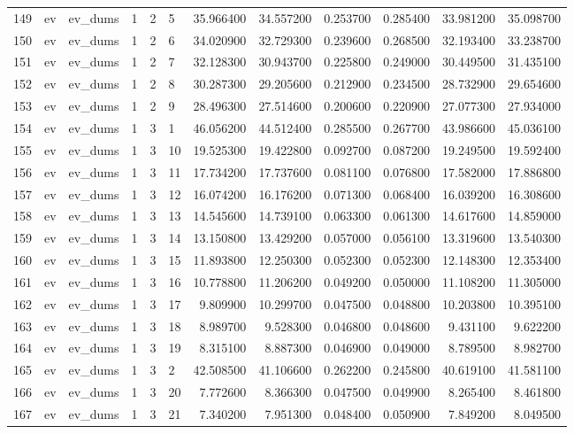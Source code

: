 \begin{tabular}{llllllrrrrrr}
149 & ev & ev_dums & 1 & 2 & 5 & 35.966400 & 34.557200 & 0.253700 & 0.285400 & 33.981200 & 35.098700 \\
150 & ev & ev_dums & 1 & 2 & 6 & 34.020900 & 32.729300 & 0.239600 & 0.268500 & 32.193400 & 33.238700 \\
151 & ev & ev_dums & 1 & 2 & 7 & 32.128300 & 30.943700 & 0.225800 & 0.249000 & 30.449500 & 31.435100 \\
152 & ev & ev_dums & 1 & 2 & 8 & 30.287300 & 29.205600 & 0.212900 & 0.234500 & 28.732900 & 29.654600 \\
153 & ev & ev_dums & 1 & 2 & 9 & 28.496300 & 27.514600 & 0.200600 & 0.220900 & 27.077300 & 27.934000 \\
154 & ev & ev_dums & 1 & 3 & 1 & 46.056200 & 44.512400 & 0.285500 & 0.267700 & 43.986600 & 45.036100 \\
155 & ev & ev_dums & 1 & 3 & 10 & 19.525300 & 19.422800 & 0.092700 & 0.087200 & 19.249500 & 19.592400 \\
156 & ev & ev_dums & 1 & 3 & 11 & 17.734200 & 17.737600 & 0.081100 & 0.076800 & 17.582000 & 17.886800 \\
157 & ev & ev_dums & 1 & 3 & 12 & 16.074200 & 16.176200 & 0.071300 & 0.068400 & 16.039200 & 16.308600 \\
158 & ev & ev_dums & 1 & 3 & 13 & 14.545600 & 14.739100 & 0.063300 & 0.061300 & 14.617600 & 14.859000 \\
159 & ev & ev_dums & 1 & 3 & 14 & 13.150800 & 13.429200 & 0.057000 & 0.056100 & 13.319600 & 13.540300 \\
160 & ev & ev_dums & 1 & 3 & 15 & 11.893800 & 12.250300 & 0.052300 & 0.052300 & 12.148300 & 12.353400 \\
161 & ev & ev_dums & 1 & 3 & 16 & 10.778800 & 11.206200 & 0.049200 & 0.050000 & 11.108200 & 11.305000 \\
162 & ev & ev_dums & 1 & 3 & 17 & 9.809900 & 10.299700 & 0.047500 & 0.048800 & 10.203800 & 10.395100 \\
163 & ev & ev_dums & 1 & 3 & 18 & 8.989700 & 9.528300 & 0.046800 & 0.048600 & 9.431100 & 9.622200 \\
164 & ev & ev_dums & 1 & 3 & 19 & 8.315100 & 8.887300 & 0.046900 & 0.049000 & 8.789500 & 8.982700 \\
165 & ev & ev_dums & 1 & 3 & 2 & 42.508500 & 41.106600 & 0.262200 & 0.245800 & 40.619100 & 41.581100 \\
166 & ev & ev_dums & 1 & 3 & 20 & 7.772600 & 8.366300 & 0.047500 & 0.049900 & 8.265400 & 8.461800 \\
167 & ev & ev_dums & 1 & 3 & 21 & 7.340200 & 7.951300 & 0.048400 & 0.050900 & 7.849200 & 8.049500 \\

\end{tabular}
